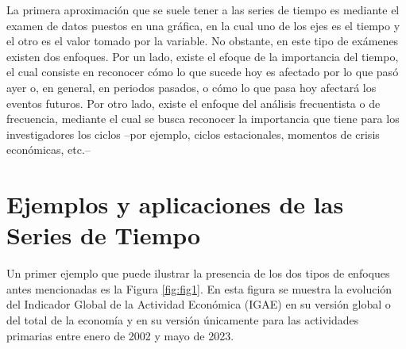 \documentclass[
]{book}
\begin{document}
La primera aproximación que se suele tener a las series de tiempo es mediante el examen de datos puestos en una gráfica, en la cual uno de los ejes es el tiempo y el otro es el valor tomado por la variable. No obstante, en este tipo de exámenes existen dos enfoques. Por un lado, existe el efoque de la importancia del tiempo, el cual consiste en reconocer cómo lo que sucede hoy es afectado por lo que pasó ayer o, en general, en periodos pasados, o cómo lo que pasa hoy afectará los eventos futuros. Por otro lado, existe el enfoque del análisis frecuentista o de frecuencia, mediante el cual se busca reconocer la importancia que tiene para los investigadores los ciclos --por ejemplo, ciclos estacionales, momentos de crisis económicas, etc.--

\hypertarget{ejemplos-y-aplicaciones-de-las-series-de-tiempo}{%
\section{Ejemplos y aplicaciones de las Series de Tiempo}\label{ejemplos-y-aplicaciones-de-las-series-de-tiempo}}

Un primer ejemplo que puede ilustrar la presencia de los dos tipos de
enfoques antes mencionadas es la Figura \ref{fig:fig1}. En esta figura se muestra la evolución del Indicador Global de la Actividad Económica (IGAE) en su versión global o del total de la economía y en su versión únicamente para las actividades primarias entre enero de 2002 y mayo de 2023.
\end{document}
